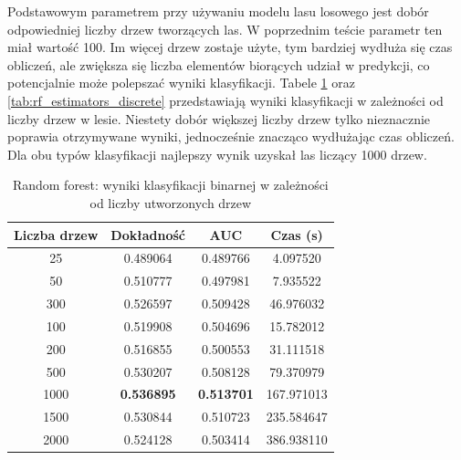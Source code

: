 \documentclass[a4paper, twoside, 11pt, openright]{article}
\begin{document}
Podstawowym parametrem przy używaniu modelu lasu losowego jest dobór odpowiedniej liczby drzew tworzących las. W poprzednim teście parametr ten miał wartość 100. Im więcej drzew zostaje użyte, tym bardziej wydłuża się czas obliczeń, ale zwiększa się liczba elementów biorących udział w predykcji, co potencjalnie może polepszać wyniki klasyfikacji. Tabele \ref{tab:rf_estimators_binary} oraz \ref{tab:rf_estimators_discrete} przedstawiają wyniki klasyfikacji w zależności od liczby drzew w lesie. Niestety dobór większej liczby drzew tylko nieznacznie poprawia otrzymywane wyniki, jednocześnie znacząco wydłużając czas obliczeń. Dla obu typów klasyfikacji najlepszy wynik uzyskał las liczący 1000 drzew.

\begin{table}[H]
    \centering
    \begin{tabular}{|c|c|c|c|}
    \hline
        \textbf{Liczba drzew} & \textbf{Dokładność} & \textbf{AUC} & \textbf{Czas (s)} \\ \hline
25         &  0.489064 &  0.489766 &    4.097520 \\ \hline
50         &  0.510777 &  0.497981 &    7.935522 \\ \hline
300        &  0.526597 &  0.509428 &   46.976032 \\ \hline
100        &  0.519908 &  0.504696 &   15.782012 \\ \hline
200        &  0.516855 &  0.500553 &   31.111518 \\ \hline
500        &  0.530207 &  0.508128 &   79.370979 \\ \hline
1000       &  \textbf{0.536895} &  \textbf{0.513701} &  167.971013 \\ \hline
1500       &  0.530844 &  0.510723 &  235.584647 \\ \hline
2000       &  0.524128 &  0.503414 &  386.938110 \\ \hline
    \end{tabular}
    \caption{Random forest: wyniki klasyfikacji binarnej w zależności od liczby utworzonych drzew}
    \label{tab:rf_estimators_binary}
\end{table}
\end{document}
